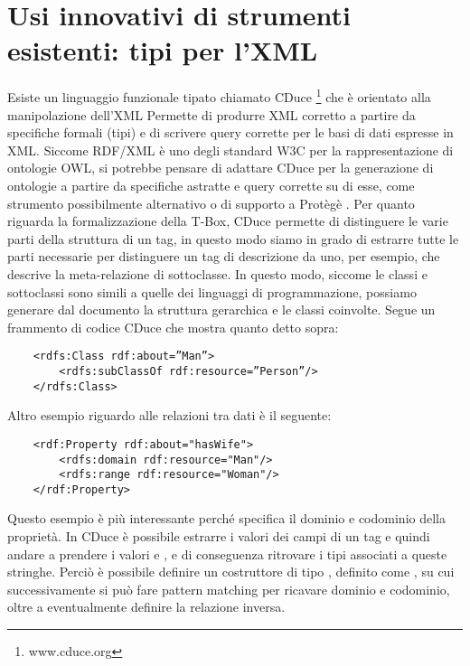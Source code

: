 \section{\large Usi innovativi di strumenti esistenti: tipi per l'XML}
Esiste un linguaggio funzionale tipato chiamato CDuce \footnote{www.cduce.org} che è orientato alla manipolazione dell'XML \cite{XML} Permette di produrre XML corretto a 
partire da specifiche formali (tipi) e di scrivere query corrette per le basi di dati espresse in XML. Siccome RDF/XML è uno degli standard W3C per la 
rappresentazione di ontologie OWL, si potrebbe pensare di adattare CDuce per la generazione di ontologie a partire da specifiche astratte e query corrette su 
di esse, come strumento possibilmente alternativo o di supporto a Protègè \cite{protege}. 
Per quanto riguarda la formalizzazione della T-Box, CDuce permette di distinguere le varie parti della struttura di un tag, in questo modo siamo in grado di 
estrarre tutte le parti necessarie per distinguere un tag di descrizione da uno, per esempio, che descrive la meta-relazione di sottoclasse. In questo modo, 
siccome le classi e sottoclassi sono simili a quelle dei linguaggi di programmazione, possiamo generare dal documento la struttura gerarchica e le classi 
coinvolte. Segue un frammento di codice CDuce che mostra quanto detto sopra:
\begin{verbatim}
    <rdfs:Class rdf:about=”Man”>
	    <rdfs:subClassOf rdf:resource=”Person”/>
    </rdfs:Class>
\end{verbatim}
Altro esempio riguardo alle relazioni tra dati è il seguente:
\begin{verbatim}
    <rdf:Property rdf:about="hasWife">
        <rdfs:domain rdf:resource="Man"/>
        <rdfs:range rdf:resource="Woman"/>
    </rdf:Property>
\end{verbatim}

Questo esempio è più interessante perché specifica il dominio e codominio della proprietà. In CDuce è possibile estrarre i valori dei campi di un tag e 
quindi andare a prendere i valori  e , e di conseguenza ritrovare i tipi associati a queste stringhe. Perciò è possibile definire un costruttore 
di tipo , definito come , su cui successivamente si può fare pattern matching per ricavare dominio e codominio, oltre a 
eventualmente definire la relazione inversa. 

